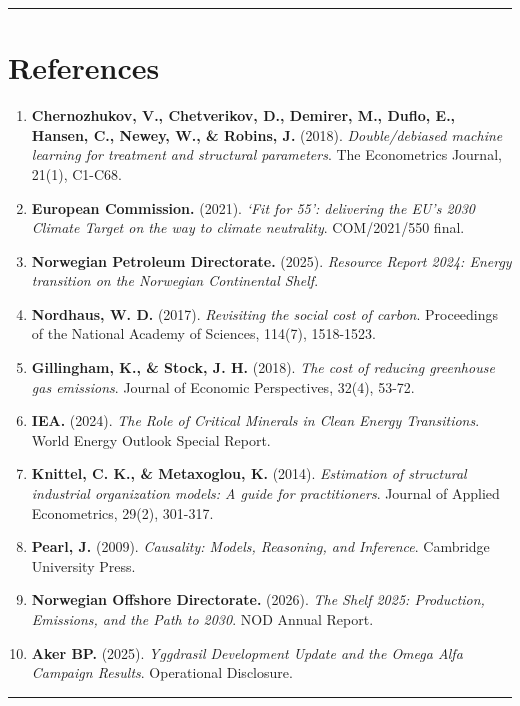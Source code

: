 \documentclass[
  11pt,
]{article}
\providecommand{\tightlist}{%
  \setlength{\itemsep}{0pt}\setlength{\parskip}{0pt}}
\begin{document}
\begin{center}\rule{0.5\linewidth}{0.5pt}\end{center}

\section{References}\label{references}

\begin{enumerate}
\def\labelenumi{\arabic{enumi}.}
\tightlist
\item
  \textbf{Chernozhukov, V., Chetverikov, D., Demirer, M., Duflo, E.,
  Hansen, C., Newey, W., \& Robins, J.} (2018). \emph{Double/debiased
  machine learning for treatment and structural parameters}. The
  Econometrics Journal, 21(1), C1-C68.
\item
  \textbf{European Commission.} (2021). \emph{`Fit for 55': delivering
  the EU's 2030 Climate Target on the way to climate neutrality}.
  COM/2021/550 final.
\item
  \textbf{Norwegian Petroleum Directorate.} (2025). \emph{Resource
  Report 2024: Energy transition on the Norwegian Continental Shelf}.
\item
  \textbf{Nordhaus, W. D.} (2017). \emph{Revisiting the social cost of
  carbon}. Proceedings of the National Academy of Sciences, 114(7),
  1518-1523.
\item
  \textbf{Gillingham, K., \& Stock, J. H.} (2018). \emph{The cost of
  reducing greenhouse gas emissions}. Journal of Economic Perspectives,
  32(4), 53-72.
\item
  \textbf{IEA.} (2024). \emph{The Role of Critical Minerals in Clean
  Energy Transitions}. World Energy Outlook Special Report.
\item
  \textbf{Knittel, C. K., \& Metaxoglou, K.} (2014). \emph{Estimation of
  structural industrial organization models: A guide for practitioners}.
  Journal of Applied Econometrics, 29(2), 301-317.
\item
  \textbf{Pearl, J.} (2009). \emph{Causality: Models, Reasoning, and
  Inference}. Cambridge University Press.
\item
  \textbf{Norwegian Offshore Directorate.} (2026). \emph{The Shelf 2025:
  Production, Emissions, and the Path to 2030}. NOD Annual Report.
\item
  \textbf{Aker BP.} (2025). \emph{Yggdrasil Development Update and the
  Omega Alfa Campaign Results}. Operational Disclosure.
\end{enumerate}

\begin{center}\rule{0.5\linewidth}{0.5pt}\end{center}
\end{document}
